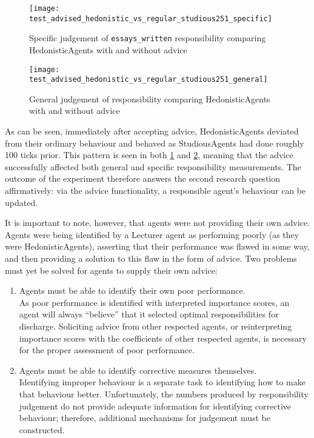 \begin{figure}[h]
    \centering
    \texttt{[image: test\_advised\_hedonistic\_vs\_regular\_studious251\_specific]}
    \caption{Specific judgement of \texttt{essays\_written} responsibility comparing HedonisticAgents with and without advice}
    \label{fig:specific_advice}
\end{figure}

\begin{figure}[h]
    \centering
    \texttt{[image: test\_advised\_hedonistic\_vs\_regular\_studious251\_general]}
    \caption{General judgement of responsibility comparing HedonisticAgents with and without advice}
    \label{fig:general_advice}
\end{figure}

As can be seen, immediately after accepting advice, HedonisticAgents deviated from their ordinary behaviour and behaved as StudiousAgents had done roughly 100 ticks prior. This pattern is seen in both \cref{fig:specific_advice} and \cref{fig:general_advice}, meaning that the advice successfully affected both general and specific responsibility measurements. The outcome of the experiment therefore answers the second research question affirmatively: via the advice functionality, a responsible agent's behaviour can be updated.\par

It is important to note, however, that agents were not providing their own advice. Agents were being identified by a Lecturer agent as performing poorly (as they were HedonisticAgents), asserting that their performance was flawed in some way, and then providing a solution to this flaw in the form of advice. Two problems must yet be solved for agents to supply their own advice:

\begin{enumerate}
    \item Agents must be able to identify their own poor performance.\\
        As poor performance is identified with interpreted importance scores, an agent will always ``believe'' that it selected optimal responsibilities for discharge. Soliciting advice from other respected agents, or reinterpreting importance scores with the coefficients of other respected agents, is necessary for the proper assessment of poor performance.
    \item Agents must be able to identify corrective measures themselves.\\
        Identifying improper behaviour is a separate task to identifying how to make that behaviour better. Unfortunately, the numbers produced by responsibility judgement do not provide adequate information for identifying corrective behaviour; therefore, additional mechanisms for judgement must be constructed.
\end{enumerate}

